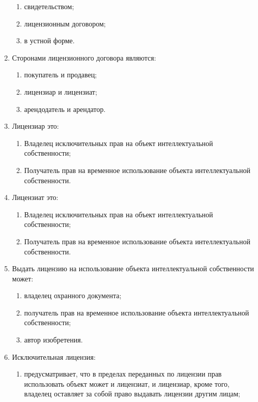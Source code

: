 \begin{enumerate}
    \begin{enumerate}
        \item свидетельством;
        \item \cmark лицензионным договором;
        \item в устной форме.
    \end{enumerate}
    \item Сторонами лицензионного договора являются: 
    \begin{enumerate}
        \item покупатель и продавец;
        \item \cmark лицензиар и лицензиат;
        \item арендодатель и арендатор.
    \end{enumerate}
    \item Лицензиар это:
    \begin{enumerate}
        \item \cmark Владелец исключительных прав на объект интеллектуальной собственности;
        \item Получатель прав на временное использование объекта интеллектуальной собственности.
    \end{enumerate}
    \item Лицензиат это:
    \begin{enumerate}
        \item Владелец исключительных прав на объект интеллектуальной собственности; 
        \item \cmark Получатель прав на временное использование объекта интеллектуальной собственности.
    \end{enumerate}
    \item Выдать лицензию на использование объекта интеллектуальной собственности может: 
    \begin{enumerate}
        \item \cmark владелец охранного документа;
        \item получатель прав на временное использование объекта интеллектуальной собственности;
        \item автор изобретения.
    \end{enumerate}
    \item Исключительная лицензия:
    \begin{enumerate}
        \item предусматривает, что в пределах переданных по лицензии прав использовать объект может и лицензиат, и лицензиар, кроме того, владелец оставляет за собой право выдавать лицензии другим лицам; 

\end{enumerate}
\end{enumerate}
